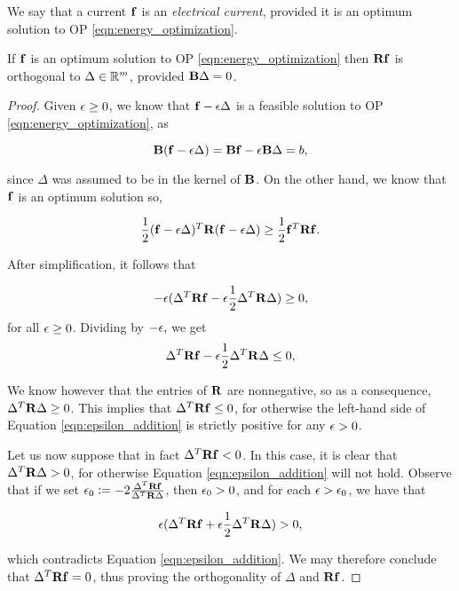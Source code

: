 \documentclass[11pt]{article}
\begin{document}
We say that a current $\V{f}$ is an \textit{electrical current},
provided it is an optimum solution to OP \ref{eqn:energy_optimization}.

\begin{proposition}

If $\V{f}$ is an optimum solution to OP \ref{eqn:energy_optimization}
then $\V{R}\V{f}$ is orthogonal to $\Delta \in \mathbb R^{m}$,
provided $\V{B}\Delta=0$. 


\end{proposition}


\begin{proof}

Given $\epsilon \ge 0$, we know that $\V{f} - \eps \Delta$ is a feasible
solution to OP \ref{eqn:energy_optimization}, as 

\[
	\V{B}(\V{f} - \eps \Delta) = \V{B}\V{f} - \eps \V{B}\Delta= b,
\]

since $\Delta$ was assumed to be in the kernel of $\V{B}$. On the other
hand, we know that $\V{f}$ is an optimum solution so,

\[
	\frac{1}{2}(\V{f} - \eps \Delta)^{T} \V{R} (\V{f} - \eps \Delta) \ge \frac{1}{2}\V{f}^{T} \V{R} \V{f}.
\]

After simplification, it follows that

\begin{equation}\label{eqn:epsilon_addition}
	- \eps( \Delta^{T} \V{R} \V{f} - \eps \frac{1}{2} \Delta^{T} \V{R} \Delta) \ge 0,
\end{equation}
for all $\epsilon \ge 0$. Dividing by $-\epsilon,$ we get
\begin{equation}
	\Delta^{T} \V{R} \V{f} - \eps \frac{1}{2} \Delta^{T} \V{R} \Delta \le 0,
\end{equation}


We know however that the entries of $\V{R}$ are nonnegative,
so as a consequence, $\Delta^{T} \V{R} \Delta \ge 0$. This implies that $\Delta^{T} \V{R} \V{f} \le 0$,
for otherwise the left-hand side of Equation \ref{eqn:epsilon_addition} is strictly positive for any $\epsilon > 0$.

Let us now suppose that in fact $\Delta^{T} \V{R} \V{f} <0$. In this case, it is clear that 
$\Delta^{T} \V{R} \Delta >0$, for otherwise Equation \ref{eqn:epsilon_addition} will not hold.
Observe that if we set $\eps_0 := -2 \frac{\Delta^{T} \V{R} \V{f}}{ \Delta^{T} \V{R} \Delta}$, then
$\epsilon_0 >0$, and for each $\epsilon > \epsilon_0$, we have that

\[
 	\eps(\Delta^{T} \V{R} \V{f} + \eps \frac{1}{2} \Delta^{T} \V{R} \Delta) >0,
\]

which contradicts Equation \ref{eqn:epsilon_addition}.
We may therefore conclude that $\Delta^{T} \V{R} \V{f} =0$, thus proving the orthogonality
of $\Delta$ and $\V{Rf}$.


\end{proof}
\end{document}
